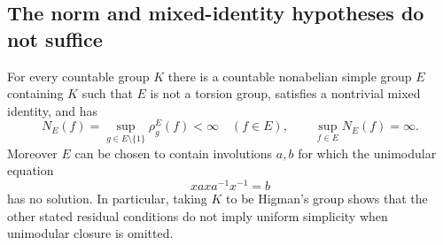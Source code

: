 \subsection{The norm and mixed-identity hypotheses do not suffice}

\begin{proposition}\label{prop:tree-norm-boundary}
For every countable group $K$ there is a countable nonabelian simple group
$E$ containing $K$ such that $E$ is not a torsion group, satisfies a
nontrivial mixed identity, and has
\[
 N_E(f)=\sup_{g\in E\setminus\{1\}}\rho_g^E(f)<\infty
 \quad(f\in E),\qquad \sup_{f\in E}N_E(f)=\infty.
\]
Moreover $E$ can be chosen to contain involutions $a,b$ for which the
unimodular equation
\begin{equation}\label{eq:tree-unsolvable-unimodular}
 xax a^{-1}x^{-1}=b
\end{equation}
has no solution.  In particular, taking $K$ to be Higman's group shows
that the other stated residual conditions do not imply uniform
simplicity when unimodular closure is omitted.
\end{proposition}

